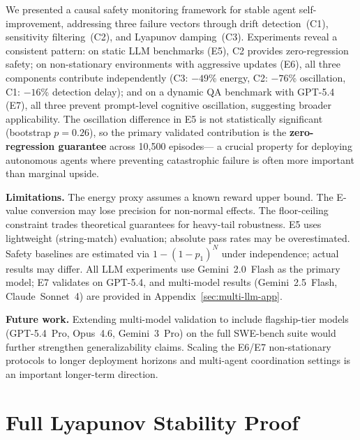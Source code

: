 \documentclass{article}
\begin{document}
We presented a causal safety monitoring framework for stable agent
self-improvement, addressing three failure vectors through
drift detection~(C1), sensitivity filtering~(C2), and Lyapunov
damping~(C3). Experiments reveal a consistent pattern: on
static LLM benchmarks (E5), C2 provides zero-regression safety;
on non-stationary environments with aggressive updates (E6), all
three components contribute independently (C3: $-49$\% energy,
C2: $-76$\% oscillation, C1: $-16$\% detection delay);
and on a dynamic QA benchmark with GPT-5.4 (E7), all three
prevent prompt-level cognitive oscillation, suggesting
broader applicability.
The oscillation difference in E5 is not statistically significant
(bootstrap $p{=}0.26$), so the primary validated contribution is
the \textbf{zero-regression guarantee} across 10{,}500 episodes---
a crucial property for deploying autonomous agents where preventing
catastrophic failure is often more important than marginal upside.

\textbf{Limitations.}
The energy proxy assumes a known reward upper bound.
The E-value conversion may lose precision for non-normal effects.
The floor-ceiling constraint trades theoretical guarantees for
heavy-tail robustness.
E5 uses lightweight (string-match) evaluation; absolute pass rates
may be overestimated.
Safety baselines are estimated via $1{-}(1{-}p_1)^N$ under
independence; actual results may differ.
All LLM experiments use Gemini~2.0~Flash as the primary model;
E7 validates on GPT-5.4, and multi-model results (Gemini~2.5~Flash,
Claude~Sonnet~4) are provided in Appendix~\ref{sec:multi-llm-app}.

\textbf{Future work.}
Extending multi-model validation to include flagship-tier models
(GPT-5.4~Pro, Opus~4.6, Gemini~3~Pro) on the full SWE-bench
suite would further strengthen generalizability claims.
Scaling the E6/E7 non-stationary protocols to longer deployment
horizons and multi-agent coordination settings is an important
longer-term direction.






\appendix

\section{Full Lyapunov Stability Proof}
\label{sec:proof}
\end{document}
